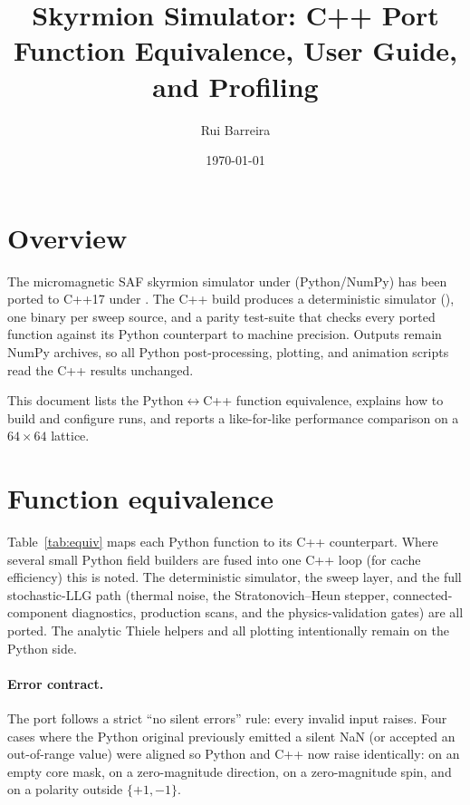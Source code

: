 \documentclass[11pt,a4paper]{article}
\title{Skyrmion Simulator: C++ Port \\
       Function Equivalence, User Guide, and Profiling}
\author{Rui Barreira}
\date{\today}
\begin{document}
\maketitle

\section{Overview}

The micromagnetic SAF skyrmion simulator under 
(Python/NumPy) has been ported to C++17 under
. The C++ build produces a deterministic
simulator (), one binary per sweep source,
and a parity test-suite that checks every ported function against its
Python counterpart to machine precision. Outputs remain NumPy
 archives, so all Python post-processing, plotting, and
animation scripts read the C++ results unchanged.

This document lists the Python$\leftrightarrow$C++ function equivalence,
explains how to build and configure runs, and reports a like-for-like
performance comparison on a $64\times64$ lattice.

\section{Function equivalence}

Table~\ref{tab:equiv} maps each Python function to its C++ counterpart.
Where several small Python field builders are fused into one C++ loop
(for cache efficiency) this is noted. The deterministic simulator, the
sweep layer, and the full stochastic-LLG path (thermal noise, the
Stratonovich--Heun stepper, connected-component diagnostics, production
scans, and the physics-validation gates) are all ported. The analytic
Thiele helpers and all plotting intentionally remain on the Python side.

\paragraph{Error contract.} The port follows a strict ``no silent
errors'' rule: every invalid input raises. Four cases where the Python
original previously emitted a silent NaN (or accepted an out-of-range
value) were aligned so Python and C++ now raise identically:
 on an empty core mask,  on a
zero-magnitude direction,  on a zero-magnitude spin, and
 on a polarity outside $\{+1,-1\}$.
\end{document}
